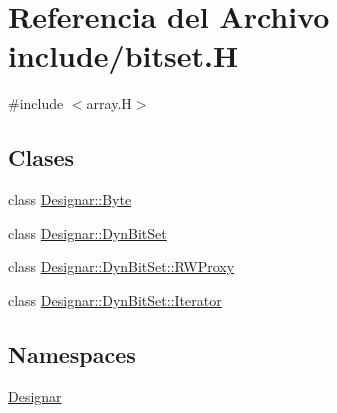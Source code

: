 \hypertarget{bitset_8_h}{}\section{Referencia del Archivo include/bitset.H}
\label{bitset_8_h}
{\ttfamily \#include $<$array.\+H$>$}\newline
\subsection*{Clases}
\begin{DoxyCompactItemize}
\item 
class \hyperlink{class_designar_1_1_byte}{Designar\+::\+Byte}
\item 
class \hyperlink{class_designar_1_1_dyn_bit_set}{Designar\+::\+Dyn\+Bit\+Set}
\item 
class \hyperlink{class_designar_1_1_dyn_bit_set_1_1_r_w_proxy}{Designar\+::\+Dyn\+Bit\+Set\+::\+R\+W\+Proxy}
\item 
class \hyperlink{class_designar_1_1_dyn_bit_set_1_1_iterator}{Designar\+::\+Dyn\+Bit\+Set\+::\+Iterator}
\end{DoxyCompactItemize}
\subsection*{Namespaces}
\begin{DoxyCompactItemize}
\item 
 \hyperlink{namespace_designar}{Designar}
\end{DoxyCompactItemize}
